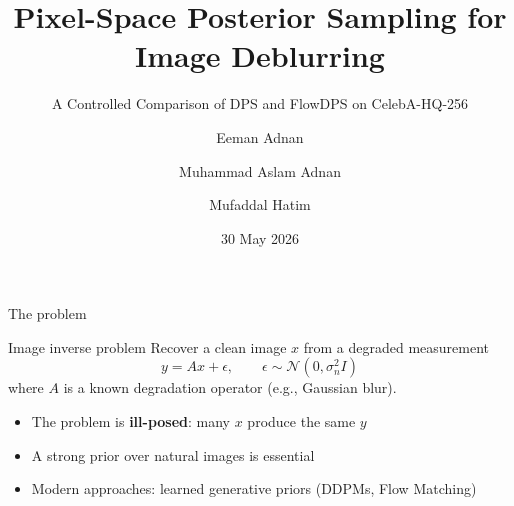 \documentclass[10pt,aspectratio=169]{beamer}
\title{Pixel-Space Posterior Sampling for Image Deblurring}
\subtitle{A Controlled Comparison of DPS and FlowDPS on CelebA-HQ-256}
\date{30 May 2026}
\author{Eeman Adnan \and Muhammad Aslam Adnan \and Mufaddal Hatim}
\institute{Group 13 \and Department of Artificial Intelligence \and LUMS}
\begin{document}
\maketitle

\begin{frame}{The problem}
  \begin{block}{Image inverse problem}
    Recover a clean image $x$ from a degraded measurement
    \[
      y = A x + \epsilon, \qquad \epsilon \sim \mathcal{N}(0, \sigma_n^2 I)
    \]
    where $A$ is a known degradation operator (e.g., Gaussian blur).
  \end{block}

  \begin{itemize}
    \item The problem is \textbf{ill-posed}: many $x$ produce the same $y$
    \item A strong prior over natural images is essential
    \item Modern approaches: learned generative priors (DDPMs, Flow Matching)
  \end{itemize}

\end{frame}
\end{document}
